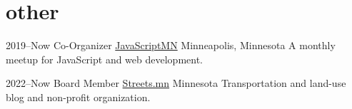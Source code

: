\documentclass[]{cv-style} %
\begin{document}
\section{other}

\begin{entrylist}


\entry
{2019--Now}
{Co-Organizer {\normalfont \href{https://javascriptmn.com}{JavaScriptMN}}}
{Minneapolis, Minnesota}
{A monthly meetup for JavaScript and web development.}



\entry
{2022--Now}
{Board Member {\normalfont \href{https://streets.mn}{Streets.mn}}}
{Minnesota}
{Transportation and land-use blog and non-profit organization.}


\end{entrylist}
\end{document}
